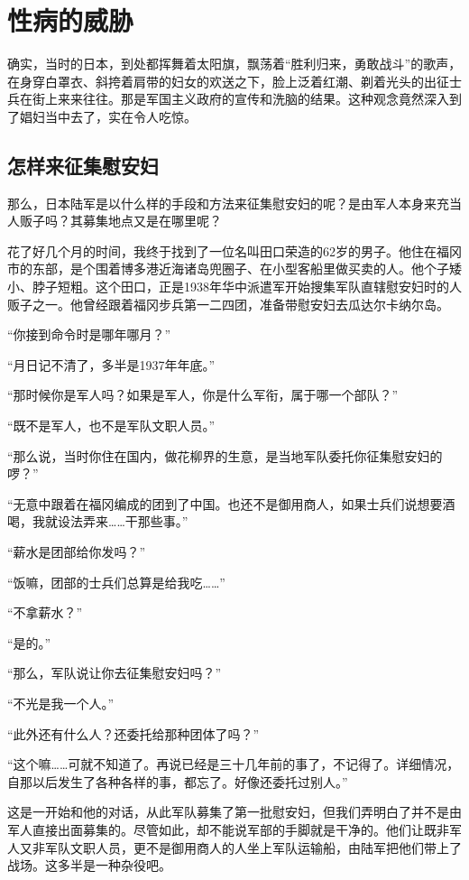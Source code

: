 \documentclass[12pt,UTF8]{ctexbook}
\begin{document}
\chapter{性病的威胁}

确实，当时的日本，到处都挥舞着太阳旗，飘荡着“胜利归来，勇敢战斗”的歌声，在身穿白罩衣、斜挎着肩带的妇女的欢送之下，脸上泛着红潮、剃着光头的出征士兵在街上来来往往。那是军国主义政府的宣传和洗脑的结果。这种观念竟然深入到了娼妇当中去了，实在令人吃惊。

\section{怎样来征集慰安妇}

那么，日本陆军是以什么样的手段和方法来征集慰安妇的呢？是由军人本身来充当人贩子吗？其募集地点又是在哪里呢？

花了好几个月的时间，我终于找到了一位名叫田口荣造的62岁的男子。他住在福冈市的东部，是个围着博多港近海诸岛兜圈子、在小型客船里做买卖的人。他个子矮小、脖子短粗。这个田口，正是1938年华中派遣军开始搜集军队直辖慰安妇时的人贩子之一。他曾经跟着福冈步兵第一二四团，准备带慰安妇去瓜达尔卡纳尔岛。

“你接到命令时是哪年哪月？”

“月日记不清了，多半是1937年年底。”

“那时候你是军人吗？如果是军人，你是什么军衔，属于哪一个部队？”

“既不是军人，也不是军队文职人员。”

“那么说，当时你住在国内，做花柳界的生意，是当地军队委托你征集慰安妇的啰？”

“无意中跟着在福冈编成的团到了中国。也还不是御用商人，如果士兵们说想要酒喝，我就设法弄来……干那些事。”

“薪水是团部给你发吗？”

“饭嘛，团部的士兵们总算是给我吃……”

“不拿薪水？”

“是的。”

“那么，军队说让你去征集慰安妇吗？”

“不光是我一个人。”

“此外还有什么人？还委托给那种团体了吗？”

“这个嘛……可就不知道了。再说已经是三十几年前的事了，不记得了。详细情况，自那以后发生了各种各样的事，都忘了。好像还委托过别人。”

这是一开始和他的对话，从此军队募集了第一批慰安妇，但我们弄明白了并不是由军人直接出面募集的。尽管如此，却不能说军部的手脚就是干净的。他们让既非军人又非军队文职人员，更不是御用商人的人坐上军队运输船，由陆军把他们带上了战场。这多半是一种杂役吧。
\end{document}
